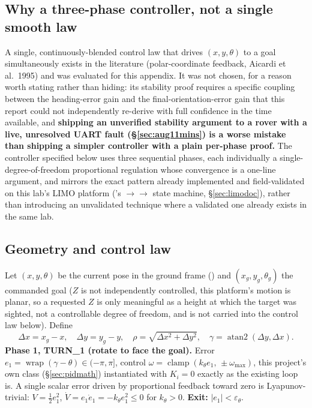 \subsection{Why a three-phase controller, not a single smooth law}
\label{ap:posecontrolchoice}
A single, continuously-blended control law that drives $(x,y,\theta)$ to a
goal simultaneously exists in the literature (polar-coordinate feedback,
Aicardi et al.\ 1995) and was evaluated for this appendix. It was not
chosen, for a reason worth stating rather than hiding: its stability proof
requires a specific coupling between the heading-error gain and the
final-orientation-error gain that this report could not independently
re-derive with full confidence in the time available, and \textbf{shipping
an unverified stability argument to a rover with a live, unresolved UART
fault (\S\ref{sec:aug11mins}) is a worse mistake than shipping a simpler
controller with a plain per-phase proof.} The controller specified below
uses three sequential phases, each individually a single-degree-of-freedom
proportional regulation whose convergence is a one-line argument, and
mirrors the exact pattern already implemented and field-validated on this
lab's LIMO platform ('s
$\to$$\to$ state machine,
\S\ref{sec:limodoc}), rather than introducing an unvalidated technique where
a validated one already exists in the same lab.

\subsection{Geometry and control law}
\label{ap:posecontrolmath}
Let $(x,y,\theta)$ be the current pose in the ground frame
() and $(x_g,y_g,\theta_g)$ the commanded goal ($Z$ is
not independently controlled, this platform's motion is planar, so a
requested $Z$ is only meaningful as a height at which the target was sighted,
not a controllable degree of freedom, and is not carried into the control
law below). Define
\begin{equation}
\Delta x = x_g - x,\quad \Delta y = y_g - y,\quad
\rho = \sqrt{\Delta x^2+\Delta y^2},\quad
\gamma = \operatorname{atan2}(\Delta y,\Delta x).
\label{eq:posegeom}
\end{equation}
\textbf{Phase 1, TURN\_1 (rotate to face the goal).} Error
$e_1=\operatorname{wrap}(\gamma-\theta)\in(-\pi,\pi]$, control
$\omega = \operatorname{clamp}(k_\theta e_1,\,\pm\omega_{\max})$, this
project's own  class (\S\ref{sec:pidmath}) instantiated with
$K_i{=}0$ exactly as the existing  loop is. A
single scalar error driven by proportional feedback toward zero is
Lyapunov-trivial: $V=\tfrac12 e_1^2$, $\dot V = e_1\dot e_1 = -k_\theta e_1^2
\le 0$ for $k_\theta>0$.
\textbf{Exit:} $|e_1|<\varepsilon_\theta$.

